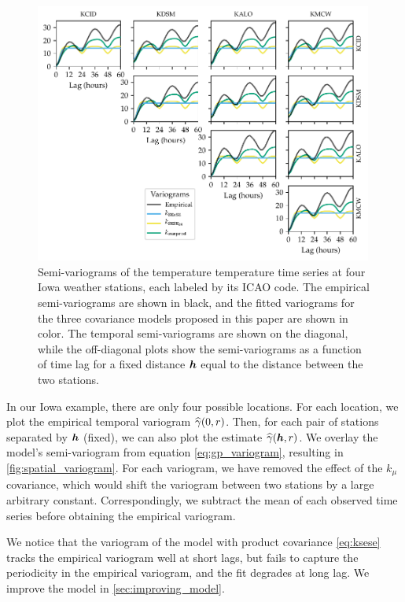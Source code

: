 \documentclass[12pt]{article}
\begin{document}
\begin{figure}[!tbp]
\centering
\includegraphics[width=0.99\textwidth]{../figures/spatial_variogram.pdf}
\caption{\label{fig:spatial_variogram}
Semi-variograms of the temperature temperature time series at four Iowa weather stations, each labeled by its ICAO code.
The empirical semi-variograms are shown in black, and the fitted variograms for the three covariance models proposed in this paper are shown in color.
The temporal semi-variograms are shown on the diagonal, while the off-diagonal plots show the semi-variograms as a function of time lag for a fixed distance \(\bm{h}\) equal to the distance between the two stations.
}
\end{figure}

In our Iowa example, there are only four possible locations. For each location, we plot the empirical temporal variogram \(\widehat\gamma\del{0,r}\). Then, for each pair of stations separated by \(\bm{h}\) (fixed), we can also plot the estimate \(\widehat\gamma\del{\hvec,r}\). 
We overlay the model's semi-variogram from equation \autoref{eq:gp_variogram}, resulting in \autoref{fig:spatial_variogram}.
For each variogram, we have removed the effect of the \(k_\mu\) covariance, which would shift the variogram between two stations by a large arbitrary constant.
Correspondingly, we subtract the mean of each observed time series before obtaining the empirical variogram.

We notice that the variogram of the model with product covariance \autoref{eq:ksese} tracks the empirical variogram well at short lags, but fails to capture the periodicity in the empirical variogram, and the fit degrades at long lag. We improve the model in \autoref{sec:improving_model}.
\end{document}
